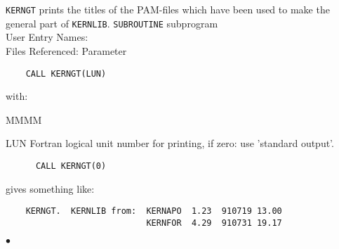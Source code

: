                          
                         
\Submitter{}                             
{\tt KERNGT} prints the titles of the PAM-files which have been
used to make the general part of {\tt KERNLIB}.
\Structure
{\tt SUBROUTINE} subprogram \\
User Entry Names:  \\
Files Referenced: Parameter
\Usage
\begin{verbatim}
    CALL KERNGT(LUN)
\end{verbatim}
with:
\begin{DL}{MMMM}
\item [LUN] Fortran logical unit number for printing,
            if zero: use 'standard output'.
\end{DL}
\Examples
\begin{verbatim}
      CALL KERNGT(0)
\end{verbatim}
gives something like:
\begin{verbatim}
    KERNGT.  KERNLIB from:  KERNAPO  1.23  910719 13.00
                            KERNFOR  4.29  910731 19.17
\end{verbatim}
$\bullet$
